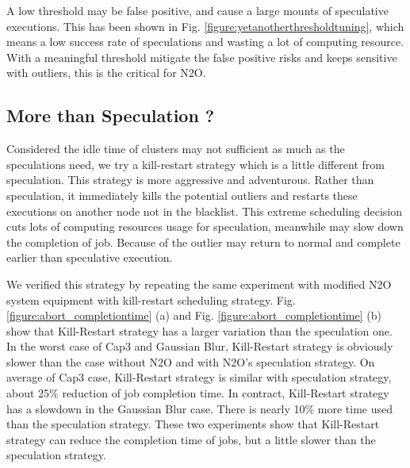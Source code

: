 A low threshold may be false positive, and cause a large mounts of speculative executions. This has been shown in Fig.  \ref{figure:yetanotherthresholdtuning}, which means a low success rate of speculations and wasting a lot of computing resource. With a meaningful threshold mitigate the false positive risks and keeps sensitive with outliers, this is the critical for N2O.

\subsection{More than Speculation ?}

Considered the idle time of clusters may not sufficient as much as the speculations need, we try a kill-restart strategy which is a little different from speculation. This strategy is more aggressive and adventurous. Rather than speculation, it immediately kills the potential outliers and restarts these executions on another node not in the blacklist. This extreme scheduling decision cuts lots of computing resources usage for speculation, meanwhile may slow down the completion of job. Because of the outlier may return to normal and complete earlier than speculative execution.

We verified this strategy by repeating the same experiment with modified N2O system equipment with kill-restart scheduling strategy. Fig. \ref{figure:abort_completiontime} (a) and Fig. \ref{figure:abort_completiontime} (b) show that Kill-Restart strategy has a larger variation than the speculation one. In the worst case of Cap3 and Gaussian Blur, Kill-Restart strategy is obviously slower than the case without N2O and with N2O's speculation strategy. On average of Cap3 case, Kill-Restart strategy is similar with speculation strategy, about 25\% reduction of job completion time. In contract, Kill-Restart strategy has a slowdown in the Gaussian Blur case. There is nearly 10\% more time used than the speculation strategy. These two experiments show that Kill-Restart strategy can reduce the completion time of jobs, but a little slower than the speculation strategy.

